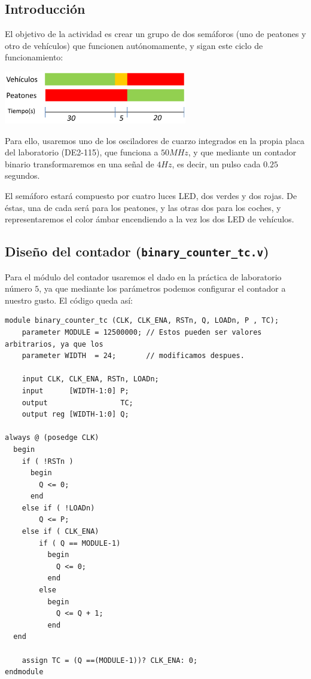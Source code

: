 \documentclass{article}
\begin{document}
\subsection*{Introducción}
El objetivo de la actividad es crear un grupo de dos semáforos (uno de peatones
y otro de vehículos) que funcionen autónomamente, y sigan este ciclo de
funcionamiento:
\begin{center}
    \includegraphics[width=8cm]{.images/CicloFuncionamiento.png}
\end{center}
Para ello, usaremos uno de los osciladores de cuarzo integrados en la propia
placa del laboratorio (DE2-115), que funciona a $50MHz$, y que mediante un
contador binario transformaremos en una señal de $4Hz$, es decir, un pulso cada
$0.25$ segundos.

El semáforo estará compuesto por cuatro luces LED, dos verdes y dos rojas. De
éstas, una de cada será para los peatones, y las otras dos para los coches, y
representaremos el color ámbar encendiendo a la vez los dos LED de vehículos.

\subsection*{Diseño del contador (\texttt{binary\_counter\_tc.v})}
Para el módulo del contador usaremos el dado en la práctica de laboratorio número
$5$, ya que mediante los parámetros podemos configurar el contador a nuestro
gusto. El código queda así:

\begin{lstlisting}[style={prettyverilog}]
module binary_counter_tc (CLK, CLK_ENA, RSTn, Q, LOADn, P , TC);
    parameter MODULE = 12500000; // Estos pueden ser valores arbitrarios, ya que los
    parameter WIDTH  = 24;       // modificamos despues.
    
    input CLK, CLK_ENA, RSTn, LOADn;
    input      [WIDTH-1:0] P;
    output                 TC;
    output reg [WIDTH-1:0] Q;

always @ (posedge CLK)
  begin
    if ( !RSTn )
      begin
        Q <= 0;
      end
    else if ( !LOADn)
        Q <= P;
    else if ( CLK_ENA)
        if ( Q == MODULE-1)
          begin
            Q <= 0;
          end
        else
          begin
            Q <= Q + 1;
          end
  end

    assign TC = (Q ==(MODULE-1))? CLK_ENA: 0;
endmodule
\end{lstlisting}
\end{document}
